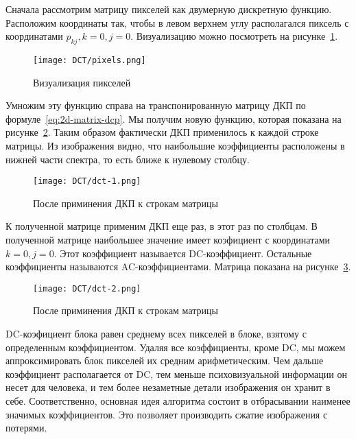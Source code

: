 Сначала рассмотрим матрицу пикселей как двумерную дискретную функцию.
Расположим координаты так, чтобы в левом верхнем углу
располагался пиксель с координатами $p_{kj}, k = 0, j = 0$.
Визуализацию можно посмотреть на рисунке~\ref{img:pixels-dct}.

\begin{figure}[ht!]
    \centering
    \caption{Визуализация пикселей}
    \texttt{[image: DCT/pixels.png]}
    \label{img:pixels-dct}
\end{figure}

Умножим эту функцию справа на транспонированную матрицу ДКП
по формуле~\ref{eq:2d-matrix-dcp}. Мы получим новую функцию,
которая показана на рисунке~\ref{img:dct-1}.
Таким образом фактически ДКП применилось к каждой строке матрицы.
Из изображения видно, что наибольшие коэффициенты расположены
в нижней части спектра, то есть ближе к нулевому столбцу.

\begin{figure}[ht!]
    \centering
    \caption{После приминения ДКП к строкам матрицы}
    \texttt{[image: DCT/dct-1.png]}
    \label{img:dct-1}
\end{figure}

К полученной матрице применим ДКП еще раз, в этот раз по столбцам.
В полученной матрице наибольшее значение имеет коэфициент с координатами
$k = 0, j = 0$. Этот коэффициент называется DC-коэффициент.
Остальные коэффициенты называются AC-коэффициентами.
Матрица показана на рисунке~\ref{img:dct-2}.

\begin{figure}[ht!]
    \centering
    \caption{После приминения ДКП к строкам матрицы}
    \texttt{[image: DCT/dct-2.png]}
    \label{img:dct-2}
\end{figure}

DC-коэфициент блока равен среднему всех пикселей в блоке,
взятому с определенным коэффициентом. Удаляя все коэффициенты,
кроме DC, мы можем аппроксимировать блок пикселей их средним
арифметическим. Чем дальше коэффициент располагается от DC,
тем меньше психовизуальной информации он несет для человека,
и тем более незаметные детали изображения он хранит в себе.
Соответственно, основная идея алгоритма состоит в отбрасывании
наименее значимых коэффициентов. Это позволяет производить сжатие
изображения с потерями.

